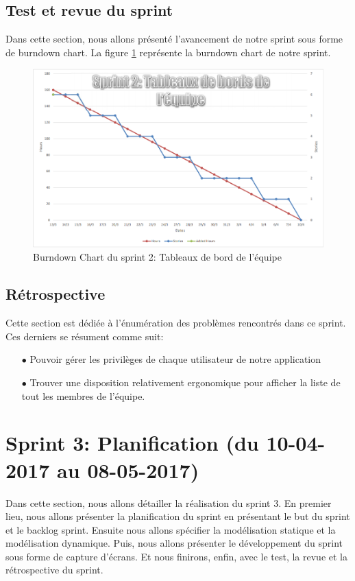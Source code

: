 \subsection{Test et revue du sprint}
Dans cette section, nous allons présenté l’avancement de notre sprint sous forme de burndown chart. La figure \ref{code93} représente la burndown chart de notre sprint.
\begin{figure}[H]
  \centering
 \includegraphics[scale=0.7]{figures/burndown_chart/sprint2.png}
 \caption{Burndown Chart du sprint 2: Tableaux de bord de l'équipe}
 \label{code93}
\end{figure}

\subsection{Rétrospective}
Cette section est dédiée à l'énumération des problèmes rencontrés dans ce sprint. Ces derniers se résument comme suit:
\begin{itemize}
    \item[$\bullet$] Pouvoir gérer les privilèges de chaque utilisateur de notre application
    \item[$\bullet$] Trouver une disposition relativement ergonomique pour afficher la liste de tout les membres de l'équipe.
\end{itemize}

\section{Sprint 3: Planification (du 10-04-2017 au 08-05-2017)}
Dans cette section, nous allons détailler la réalisation du sprint 3. En premier lieu, nous allons présenter la planification du sprint en présentant le but du sprint et le backlog sprint. Ensuite nous allons spécifier la modélisation statique et la modélisation dynamique. Puis, nous allons présenter le développement du sprint sous forme de capture d'écrans. Et nous finirons, enfin, avec le test, la revue et la rétrospective du sprint.

